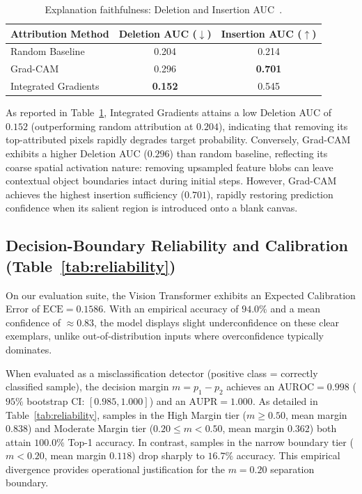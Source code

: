 \documentclass[journal,10pt,twocolumn]{IEEEtran}
\begin{document}
\begin{table}[t]
\centering
\caption{Explanation faithfulness: Deletion and Insertion AUC~\cite{petsiuk2018rise}.}
\label{tab:faithfulness}
\begin{tabular}{lcc}
\toprule
\textbf{Attribution Method} & \textbf{Deletion AUC ($\downarrow$)} & \textbf{Insertion AUC ($\uparrow$)} \\
\midrule
Random Baseline & 0.204 & 0.214 \\
Grad-CAM & 0.296 & \textbf{0.701} \\
Integrated Gradients & \textbf{0.152} & 0.545 \\
\bottomrule
\end{tabular}
\end{table}

As reported in Table~\ref{tab:faithfulness}, Integrated Gradients attains a low Deletion AUC of $0.152$ (outperforming random attribution at $0.204$), indicating that removing its top-attributed pixels rapidly degrades target probability. Conversely, Grad-CAM exhibits a higher Deletion AUC ($0.296$) than random baseline, reflecting its coarse spatial activation nature: removing upsampled feature blobs can leave contextual object boundaries intact during initial steps. However, Grad-CAM achieves the highest insertion sufficiency ($0.701$), rapidly restoring prediction confidence when its salient region is introduced onto a blank canvas.

\subsection{Decision-Boundary Reliability and Calibration (Table~\ref{tab:reliability})}
On our evaluation suite, the Vision Transformer exhibits an Expected Calibration Error of $\text{ECE} = 0.1586$. With an empirical accuracy of $94.0\%$ and a mean confidence of $\approx 0.83$, the model displays slight underconfidence on these clear exemplars, unlike out-of-distribution inputs where overconfidence typically dominates.

When evaluated as a misclassification detector (positive class = correctly classified sample), the decision margin $m = p_1 - p_2$ achieves an $\text{AUROC} = 0.998$ ($95\%$ bootstrap CI: $[0.985, 1.000]$) and an $\text{AUPR} = 1.000$. As detailed in Table~\ref{tab:reliability}, samples in the High Margin tier ($m \ge 0.50$, mean margin $0.838$) and Moderate Margin tier ($0.20 \le m < 0.50$, mean margin $0.362$) both attain $100.0\%$ Top-1 accuracy. In contrast, samples in the narrow boundary tier ($m < 0.20$, mean margin $0.118$) drop sharply to $16.7\%$ accuracy. This empirical divergence provides operational justification for the $m = 0.20$ separation boundary.
\end{document}
